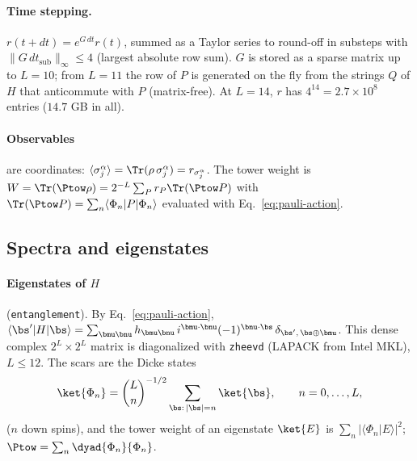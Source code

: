 \paragraph{Time stepping.} $r(t + dt) = e^{G\,dt}r(t)$, summed as a Taylor series to round-off in substeps with $\lVert G\,dt_{\mathrm{sub}}\rVert_\infty \le 4$ (largest absolute row sum). $G$ is stored as a sparse matrix up to $L = 10$; from $L = 11$ the row of $P$ is generated on the fly from the strings $Q$ of $H$ that anticommute with $P$ (matrix-free). At $L = 14$, $r$ has $4^{14} = 2.7\times10^8$ entries ($14.7$ GB in all).

\paragraph{Observables} are coordinates: $\langle\sigma^\alpha_j\rangle = \Tr(\rho\,\sigma^\alpha_j) = r_{\sigma^\alpha_j}$. The tower weight is $W = \Tr(\Ptow\rho) = 2^{-L}\sum_P r_P\Tr(\Ptow P)$ with $\Tr(\Ptow P) = \sum_n\langle\Phi_n\vert P\vert\Phi_n\rangle$ evaluated with Eq.~\eqref{eq:pauli-action}.

\subsection{Spectra and eigenstates}

\paragraph{Eigenstates of $H$} (\texttt{entanglement}). By Eq.~\eqref{eq:pauli-action}, $\langle\bs'\vert H\vert\bs\rangle = \sum_{\bmu\bnu}h_{\bmu\bnu}\,i^{\bmu\cdot\bnu}(-1)^{\bnu\cdot\bs}\,\delta_{\bs',\,\bs\oplus\bmu}$. This dense complex $2^L\times2^L$ matrix is diagonalized with \texttt{zheevd} (LAPACK from Intel MKL), $L \le 12$. The scars are the Dicke states
\begin{equation}
\ket{\Phi_n} = \binom{L}{n}^{-1/2}\sum_{\bs:\,\lvert\bs\rvert = n}\ket{\bs}, \qquad n = 0, \dots, L,
\end{equation}
($n$ down spins), and the tower weight of an eigenstate $\ket{E}$ is $\sum_n\lvert\langle\Phi_n\vert E\rangle\rvert^2$; $\Ptow = \sum_n\dyad{\Phi_n}{\Phi_n}$.

